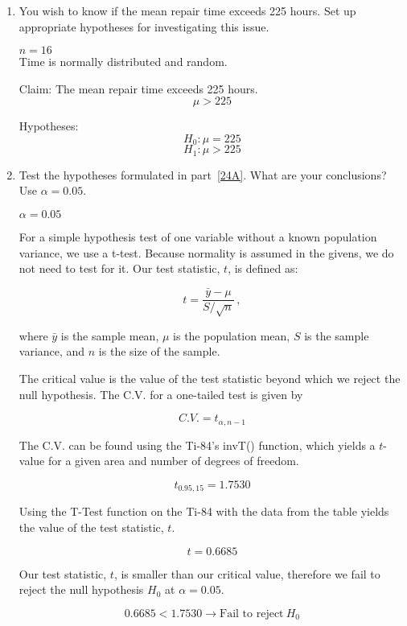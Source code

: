 \documentclass[../main.tex]{subfiles}
\begin{document}
\begin{enumerate}[label=(\alph*)]
    \item\label{24A}
    You wish to know if the mean repair time exceeds 225 hours.
    Set up appropriate hypotheses for investigating this issue.

    \givens{}
    \(n = 16\)\\
    Time is normally distributed and random.
    
    \solution{}
    Claim: The mean repair time exceeds 225 hours.
    \[\mu > 225\]

    Hypotheses:
    \[H_0 : \mu = 225\] 
    \[H_1 : \mu > 225\]

    \item
    Test the hypotheses formulated in part~\ref{24A}.
    What are your conclusions?
    Use \(\alpha = 0.05\).

    \givens{}
    \(\alpha = 0.05\)

    \solution{}
    For a simple hypothesis test of one variable without a known population variance, we use a t-test.
    Because normality is assumed in the givens, we do not need to test for it. 
    Our test statistic, \(t\), is defined as:

    \[
        t = \frac{\bar{y}-\mu}{S/\sqrt{n}} \, ,
    \]

    where \(\bar{y}\) is the sample mean, \(\mu\) is the population mean, \(S\) is the sample variance, and \(n\) is the size of the sample.

    The critical value is the value of the test statistic beyond which we reject the null hypothesis. 
    The C.V. for a one-tailed test is given by

    \[
        C.V. = t_{\alpha,n-1}
    \]

    The C.V. can be found using the Ti-84's invT() function, which yields a $t$-value for a given area and number of degrees of freedom.

    \[
        {t_{0.95,15} = 1.7530}     
    \]    
    
    Using the T-Test function on the Ti-84 with the data from the table yields the value of the test statistic, $t$.

    \[{t = 0.6685}\]

    Our test statistic, $t$, is smaller than our critical value, therefore we fail to reject the null hypothesis $H_0$ at $\alpha = 0.05$.

    \[
        \boxed{0.6685 < 1.7530 \rightarrow \textrm{Fail to reject} \ H_0}    
    \]    


\end{enumerate}
\end{document}
